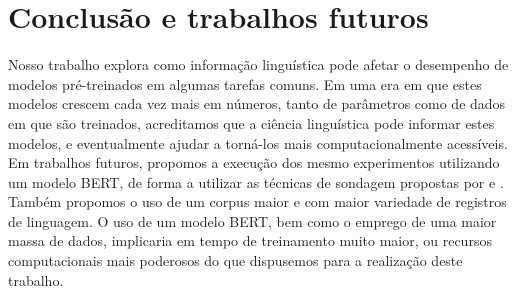 \documentclass[cic,tc]{iiufrgs}
\begin{document}
\chapter{Conclusão e trabalhos futuros}
Nosso trabalho explora como informação linguística pode afetar o desempenho de modelos pré-treinados em algumas tarefas comuns. Em uma era em que estes modelos crescem cada vez mais em números, tanto de parâmetros como de dados em que são treinados, acreditamos que a ciência linguística pode informar estes modelos, e eventualmente ajudar a torná-los mais computacionalmente acessíveis. Em trabalhos futuros, propomos a execução dos mesmo experimentos utilizando um modelo BERT, de forma a utilizar as técnicas de sondagem propostas por \citet{Hewitt2019ASP} e \citet{chen2021probing}. Também propomos o uso de um corpus maior e com maior variedade de registros de linguagem. O uso de um modelo BERT, bem como o emprego de uma maior massa de dados, implicaria em tempo de treinamento muito maior, ou recursos computacionais mais poderosos do que dispusemos para a realização deste trabalho.



\end{document}
